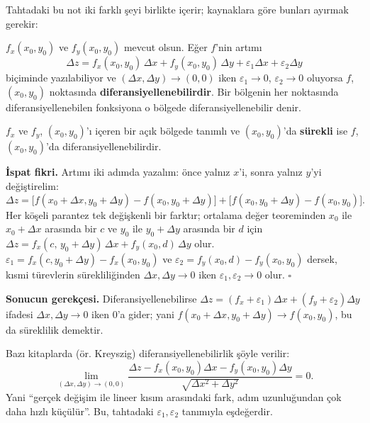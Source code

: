 Tahtadaki bu not iki farklı şeyi birlikte içerir; kaynaklara göre bunları ayırmak gerekir:

\begin{tanim}[Diferansiyellenebilirlik]
$f_x(x_0,y_0)$ ve $f_y(x_0,y_0)$ mevcut olsun. Eğer $f$'nin artımı
\[
\Delta z=f_x(x_0,y_0)\,\Delta x+f_y(x_0,y_0)\,\Delta y+\varepsilon_1\Delta x+\varepsilon_2\Delta y
\]
biçiminde yazılabiliyor ve $(\Delta x,\Delta y)\to(0,0)$ iken $\varepsilon_1\to0$, $\varepsilon_2\to0$ oluyorsa $f$,
$(x_0,y_0)$ noktasında \textbf{diferansiyellenebilirdir}. Bir bölgenin her noktasında diferansiyellenebilen fonksiyona
o bölgede diferansiyellenebilir denir.
\end{tanim}

\begin{teorem}
$f_x$ ve $f_y$, $(x_0,y_0)$'ı içeren bir açık bölgede tanımlı ve $(x_0,y_0)$'da \textbf{sürekli} ise $f$,
$(x_0,y_0)$'da diferansiyellenebilirdir.
\end{teorem}

\textbf{İspat fikri.} Artımı iki adımda yazalım: önce yalnız $x$'i, sonra yalnız $y$'yi değiştirelim:
\[
\Delta z=\big[f(x_0+\Delta x,y_0+\Delta y)-f(x_0,y_0+\Delta y)\big]+\big[f(x_0,y_0+\Delta y)-f(x_0,y_0)\big].
\]
Her köşeli parantez tek değişkenli bir farktır; ortalama değer teoreminden $x_0$ ile $x_0+\Delta x$ arasında bir $c$ ve
$y_0$ ile $y_0+\Delta y$ arasında bir $d$ için
$\Delta z=f_x(c,\,y_0+\Delta y)\,\Delta x+f_y(x_0,d)\,\Delta y$ olur.
$\varepsilon_1=f_x(c,y_0+\Delta y)-f_x(x_0,y_0)$ ve $\varepsilon_2=f_y(x_0,d)-f_y(x_0,y_0)$ dersek, kısmi türevlerin
sürekliliğinden $\Delta x,\Delta y\to0$ iken $\varepsilon_1,\varepsilon_2\to0$ olur. \hfill$\square$

\textbf{Sonucun gerekçesi.} Diferansiyellenebilirse $\Delta z=(f_x+\varepsilon_1)\Delta x+(f_y+\varepsilon_2)\Delta y$
ifadesi $\Delta x,\Delta y\to0$ iken $0$'a gider; yani $f(x_0+\Delta x,y_0+\Delta y)\to f(x_0,y_0)$, bu da süreklilik
demektir.

\begin{bilgi}
Bazı kitaplarda (ör. Kreyszig) diferansiyellenebilirlik şöyle verilir:
\[
\lim_{(\Delta x,\Delta y)\to(0,0)}
\frac{\Delta z-f_x(x_0,y_0)\Delta x-f_y(x_0,y_0)\Delta y}{\sqrt{\Delta x^2+\Delta y^2}}=0 .
\]
Yani ``gerçek değişim ile lineer kısım arasındaki fark, adım uzunluğundan çok daha hızlı küçülür''. Bu, tahtadaki
$\varepsilon_1,\varepsilon_2$ tanımıyla eşdeğerdir.
\end{bilgi}

